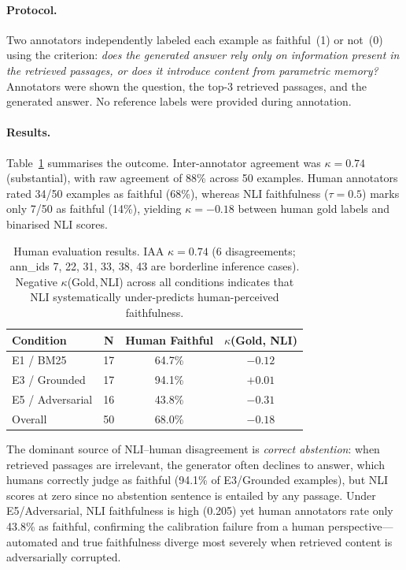 \documentclass[11pt]{article}
\begin{document}
\paragraph{Protocol.}
Two annotators independently labeled each example as faithful~(1)
or not~(0) using the criterion:
\textit{does the generated answer rely only on information present in the
retrieved passages, or does it introduce content from parametric memory?}
Annotators were shown the question, the top-3 retrieved passages,
and the generated answer.
No reference labels were provided during annotation.

\paragraph{Results.}
Table~\ref{tab:human} summarises the outcome.
Inter-annotator agreement was $\kappa{=}0.74$ (substantial),
with raw agreement of 88\% across 50 examples.
Human annotators rated 34/50 examples as faithful (68\%), whereas
NLI faithfulness ($\tau{=}0.5$) marks only 7/50 as faithful (14\%),
yielding $\kappa{=}{-}0.18$ between human gold labels and binarised
NLI scores.

\begin{table}[h]
\centering
\small
\setlength{\tabcolsep}{5pt}
\begin{tabular}{@{} l c c c @{}}
\toprule
\textbf{Condition} & \textbf{N}
  & \textbf{Human Faithful} & $\kappa$(Gold, NLI) \\
\midrule
E1 / BM25        & 17 & 64.7\% & $-0.12$ \\
E3 / Grounded    & 17 & 94.1\% & $+0.01$ \\
E5 / Adversarial & 16 & 43.8\% & $-0.31$ \\
\midrule
Overall          & 50 & 68.0\% & $-0.18$ \\
\bottomrule
\end{tabular}
\caption{
  Human evaluation results.
  IAA $\kappa{=}0.74$ (6 disagreements; ann\_ids 7, 22, 31, 33, 38, 43
  are borderline inference cases).
  Negative $\kappa$(Gold,\,NLI) across all conditions indicates that
  NLI systematically under-predicts human-perceived faithfulness.
}
\label{tab:human}
\end{table}

The dominant source of NLI--human disagreement is \emph{correct abstention}: when retrieved passages are irrelevant, the generator often declines to answer, which humans correctly judge as faithful (94.1\% of E3/Grounded examples), but NLI scores at zero since no abstention sentence is entailed by any passage.
Under E5/Adversarial, NLI faithfulness is high (0.205) yet human annotators rate only 43.8\% as faithful, confirming the calibration failure from a human perspective---automated and true faithfulness diverge most severely when retrieved content is adversarially corrupted.
\end{document}
